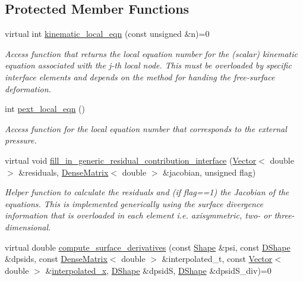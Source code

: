 \subsection*{Protected Member Functions}
\begin{DoxyCompactItemize}
\item 
virtual int \hyperlink{classoomph_1_1FluidInterfaceElement_a58a82e2fd839d4381e43d46a22bf1f25}{kinematic\+\_\+local\+\_\+eqn} (const unsigned \&n)=0
\begin{DoxyCompactList}\small\item\em Access function that returns the local equation number for the (scalar) kinematic equation associated with the j-\/th local node. This must be overloaded by specific interface elements and depends on the method for handing the free-\/surface deformation. \end{DoxyCompactList}\item 
int \hyperlink{classoomph_1_1FluidInterfaceElement_abd4aece98dee8173c6d796e23ccf1e03}{pext\+\_\+local\+\_\+eqn} ()
\begin{DoxyCompactList}\small\item\em Access function for the local equation number that corresponds to the external pressure. \end{DoxyCompactList}\item 
virtual void \hyperlink{classoomph_1_1FluidInterfaceElement_ae4ea3a18a513bed3725fdf413cf18874}{fill\+\_\+in\+\_\+generic\+\_\+residual\+\_\+contribution\+\_\+interface} (\hyperlink{classoomph_1_1Vector}{Vector}$<$ double $>$ \&residuals, \hyperlink{classoomph_1_1DenseMatrix}{Dense\+Matrix}$<$ double $>$ \&jacobian, unsigned flag)
\begin{DoxyCompactList}\small\item\em Helper function to calculate the residuals and (if flag==1) the Jacobian of the equations. This is implemented generically using the surface divergence information that is overloaded in each element i.\+e. axisymmetric, two-\/ or three-\/dimensional. \end{DoxyCompactList}\item 
virtual double \hyperlink{classoomph_1_1FluidInterfaceElement_a0180a8e36fadbbe6984f9b3c5edffc81}{compute\+\_\+surface\+\_\+derivatives} (const \hyperlink{classoomph_1_1Shape}{Shape} \&psi, const \hyperlink{classoomph_1_1DShape}{D\+Shape} \&dpsids, const \hyperlink{classoomph_1_1DenseMatrix}{Dense\+Matrix}$<$ double $>$ \&interpolated\+\_\+t, const \hyperlink{classoomph_1_1Vector}{Vector}$<$ double $>$ \&\hyperlink{classoomph_1_1FaceElement_a7aa612fec3604e08344503fbcdc357c8}{interpolated\+\_\+x}, \hyperlink{classoomph_1_1DShape}{D\+Shape} \&dpsidS, \hyperlink{classoomph_1_1DShape}{D\+Shape} \&dpsid\+S\+\_\+div)=0

\end{DoxyCompactItemize}
